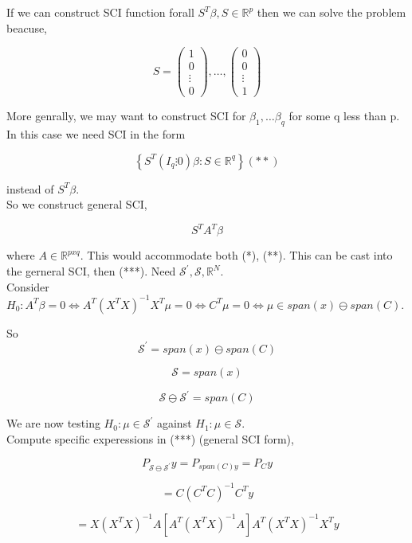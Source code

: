 \documentclass[11pt,fleqn]{book} %
\begin{document}
	

If we can construct SCI function forall $S^T\beta, S \in \mathbb{R}^p$ then we can solve the problem beacuse, 
	
		$$S = \begin{pmatrix}
			1\\
			0\\
			\vdots\\
			0
		\end{pmatrix} , \dots, \begin{pmatrix}
			0\\
			0\\
			\vdots\\
			1
		\end{pmatrix}$$

	More genrally, we may want to construct SCI for $\beta_1, \dots \beta_q$
 for some q less than p. In this case we need SCI in the form 

 	$$\left\{S^T (I_q \vdots 0) \beta: S\in \mathbb{R}^q
 	 \right\} (**) $$

 	 instead of $S^T \beta$.\\

 	 So we construct general SCI, 

 	 	$$S^T A^T \beta $$

 	 where $A \in \mathbb{R}^{pxq}$. This would accommodate both (*), (**). This can be cast into the gerneral SCI, then (***). Need $\mathcal{S}^\prime, \mathcal{S}, \mathbb{R}^N$.\\

 	 Consider $H_0: A^T \beta = 0 \Leftrightarrow A^T (X^T X)^{-1} X^T \mu = 0 \Leftrightarrow C^T \mu = 0 \Leftrightarrow \mu \in span(x) \ominus span(C)$.

 	 So 
 	 	$$\mathcal{S}^\prime = span(x) \ominus span(C) $$

 	 	$$\mathcal{S} = span(x)$$

 	 	$$\mathcal{S} \ominus \mathcal{S}^\prime = span(C) $$

 	 We are now testing $H_0: \mu \in \mathcal{S}^\prime$ against $H_1: \mu \in \mathcal{S}$.\\

 	 Compute specific experessions in (***) (general SCI form), 

 	 		$$P_{\mathcal{S} \ominus \mathcal{S}^\prime}y = P_{span(C)y} = P_C y  $$

 	 		$$= C(C^TC)^{-1}C^T y $$

 	 		$$= X(X^TX)^{-1}A [A^T (X^T X)^{-1} A ] A^T (X^T X)^{-1} X^T y $$
\end{document}
